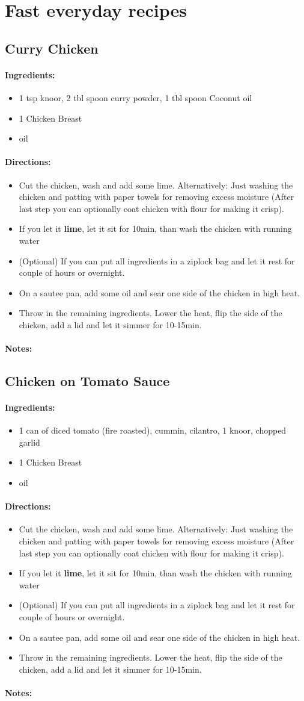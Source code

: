 \documentclass{article}
\begin{document}
\newcommand{\chick}[3]{
\subsection{#1}

\paragraph{Ingredients:}

\begin{itemize}
\item #2
\item 1 Chicken Breast 
\item oil
\end{itemize}

\paragraph{Directions:}
\begin{itemize}
\item Cut the chicken, wash and add some lime. Alternatively: Just washing the chicken and patting with paper towels for removing excess moisture (After last step you can optionally coat chicken with flour for making it crisp).
\item If you let it \textbf{lime}, let it sit for 10min, than wash the chicken with running water
\item (Optional) If you can put all ingredients in a ziplock bag and let it rest for couple of hours or overnight.
\item On a sautee pan, add some oil and sear one side of the chicken in high heat.
\item Throw in the remaining ingredients. Lower the heat, flip the side of the chicken, add a lid and let it simmer for 10-15min.
\end{itemize}

\paragraph{Notes:} #3
}

\section{Fast everyday recipes}

\chick{Curry Chicken}{1 tsp knoor, 2 tbl spoon curry powder, 1 tbl spoon Coconut oil}{}

\chick{Chicken on Tomato Sauce}{1 can of diced tomato (fire roasted), cummin, cilantro, 1 knoor, chopped garlid}
\end{document}
